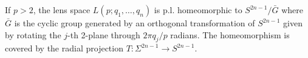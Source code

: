 If $p > 2$, the lens space $L(p; q_1, \ldots, q_n)$ is p.l. homeomorphic to $S^{2n-1}/\bar{G}$ where $\bar{G}$ is the cyclic group generated by an orthogonal transformation of $S^{2n-1}$ given by rotating the $j$-th 2-plane through $2\pi q_j/p$ radians. The homeomorphism is covered by the radial projection $T: \Sigma^{2n-1} \rightarrow S^{2n-1}$.
